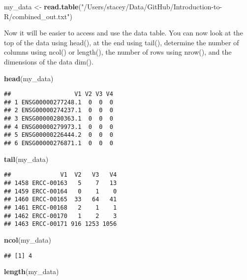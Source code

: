 \documentclass[]{article}
\newenvironment{Shaded}{\begin{snugshade}}{\end{snugshade}}
\newcommand{\KeywordTok}[1]{\textcolor[rgb]{0.13,0.29,0.53}{\textbf{#1}}}
\newcommand{\StringTok}[1]{\textcolor[rgb]{0.31,0.60,0.02}{#1}}
\newcommand{\NormalTok}[1]{#1}
\begin{document}
\begin{Shaded}
\begin{Highlighting}[]
\NormalTok{my_data <-}\StringTok{ }\KeywordTok{read.table}\NormalTok{(}\StringTok{"/Users/stacey/Data/GitHub/Introduction-to-R/combined_out.txt"}\NormalTok{)}
\end{Highlighting}
\end{Shaded}

Now it will be easier to access and use the data table. You can now look
at the top of the data using head(), at the end using tail(), determine
the number of columns using ncol() or length(), the number of rows using
nrow(), and the dimensions of the data dim().

\begin{Shaded}
\begin{Highlighting}[]
\KeywordTok{head}\NormalTok{(my_data)}
\end{Highlighting}
\end{Shaded}

\begin{verbatim}
##                  V1 V2 V3 V4
## 1 ENSG00000277248.1  0  0  0
## 2 ENSG00000274237.1  0  0  0
## 3 ENSG00000280363.1  0  0  0
## 4 ENSG00000279973.1  0  0  0
## 5 ENSG00000226444.2  0  0  0
## 6 ENSG00000276871.1  0  0  0
\end{verbatim}

\begin{Shaded}
\begin{Highlighting}[]
\KeywordTok{tail}\NormalTok{(my_data)}
\end{Highlighting}
\end{Shaded}

\begin{verbatim}
##              V1  V2   V3   V4
## 1458 ERCC-00163   5    7   13
## 1459 ERCC-00164   0    1    0
## 1460 ERCC-00165  33   64   41
## 1461 ERCC-00168   2    1    1
## 1462 ERCC-00170   1    2    3
## 1463 ERCC-00171 916 1253 1056
\end{verbatim}

\begin{Shaded}
\begin{Highlighting}[]
\KeywordTok{ncol}\NormalTok{(my_data)}
\end{Highlighting}
\end{Shaded}

\begin{verbatim}
## [1] 4
\end{verbatim}

\begin{Shaded}
\begin{Highlighting}[]
\KeywordTok{length}\NormalTok{(my_data)}
\end{Highlighting}
\end{Shaded}
\end{document}
